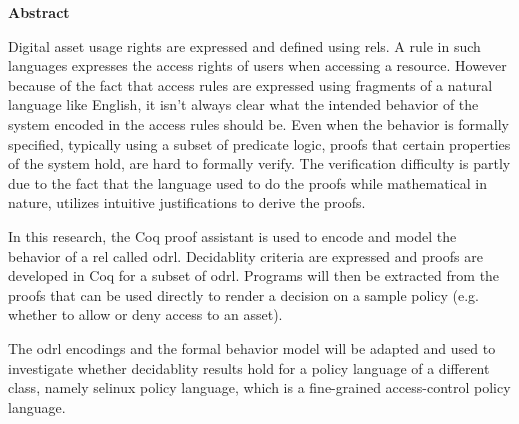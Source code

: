 
\begin{center}\textbf{Abstract}\end{center}


Digital asset usage rights are expressed and defined using \ac{rel}s. A rule in such languages expresses the access rights of users when accessing a resource. However because of the fact that access rules are expressed using fragments of a natural language like English, it isn't always clear what the intended behavior of the system encoded in the access rules should be. Even when the behavior is formally specified, typically using a subset of predicate logic, proofs that certain properties of the system hold, are hard to formally verify. The verification difficulty is partly due to the fact that the language used to do the proofs while mathematical in nature, utilizes intuitive justifications to derive the proofs. 

In this research, the Coq proof assistant is used to encode and model the behavior of a \ac{rel} called \ac{odrl}. Decidablity criteria are expressed and proofs are developed in Coq for a subset of \ac{odrl}. Programs will then be extracted from the proofs that can be used directly to render a decision on a sample policy (e.g. whether to allow or deny access to an asset). 

The \ac{odrl} encodings and the formal behavior model will be adapted and used to investigate whether decidablity results hold for a policy language of a different class, namely \ac{selinux} policy language, which is a fine-grained access-control policy language.


\cleardoublepage

